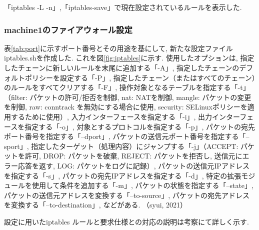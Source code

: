 \documentclass{ltjsarticle} %
\begin{document}
「iptables -L -n」,「iptables-save」で現在設定されているルールを表示した. 

\subsubsection{machine1のファイアウォール設定}

表\ref{tab:port}に示すポート番号とその用途を基にして, 新たな設定ファイルiptables.shを作成した. これを図\ref{fig:iptables}に示す. 
使用したオプションは, 指定したチェーンに新しいルールを末尾に追加する「-A」, 
指定したチェーンのデフォルトポリシーを設定する「-P」, 
指定したチェーン（またはすべてのチェーン）のルールをすべてクリアする「-F」, 
操作対象となるテーブルを指定する「-t」（filter: パケットの許可/拒否を制御, 
nat: NATを制御, 
mangle: パケットの変更を制御, 
raw: conntrack を無効にする場合に使用, 
security: SELinuxポリシーを適用するために使用）, 
入力インターフェースを指定する「-i」, 
出力インターフェースを指定する「-o」, 
対象とするプロトコルを指定する「-p」, 
パケットの宛先ポート番号を指定する「--dport」, 
パケットの送信元ポート番号を指定する「--sport」, 
指定したターゲット（処理内容）にジャンプする「-j」（ACCEPT: パケットを許可, 
DROP: パケットを破棄, 
REJECT: パケットを拒否し, 送信元にエラー応答を返す, 
LOG: パケットをログに記録）, 
パケットの送信元IPアドレスを指定する「-s」, 
パケットの宛先IPアドレスを指定する「-d」, 
特定の拡張モジュールを使用して条件を追加する「-m」, 
パケットの状態を指定する「--state」, 
パケットの送信元アドレスを変換する「--to-source」, 
パケットの宛先アドレスを変換する「--to-destination」, 
などがある. （syui, 2021）

設定に用いたiptables ルールと要求仕様との対応の説明は考察にて詳しく示す. 
\end{document}
